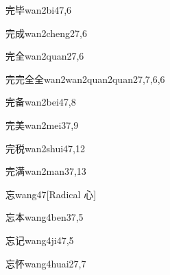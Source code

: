 \begin{verbete}{完毕}{wan2bi4}{7,6}
\end{verbete}

\begin{verbete}{完成}{wan2cheng2}{7,6}
\end{verbete}

\begin{verbete}{完全}{wan2quan2}{7,6}
\end{verbete}

\begin{verbete}{完完全全}{wan2wan2quan2quan2}{7,7,6,6}
\end{verbete}

\begin{verbete}{完备}{wan2bei4}{7,8}
\end{verbete}

\begin{verbete}{完美}{wan2mei3}{7,9}
\end{verbete}

\begin{verbete}{完税}{wan2shui4}{7,12}
\end{verbete}

\begin{verbete}{完满}{wan2man3}{7,13}
\end{verbete}

\begin{verbete}{忘}{wang4}{7}[Radical 心]
\end{verbete}

\begin{verbete}{忘本}{wang4ben3}{7,5}
\end{verbete}

\begin{verbete}{忘记}{wang4ji4}{7,5}
\end{verbete}

\begin{verbete}{忘怀}{wang4huai2}{7,7}
\end{verbete}

